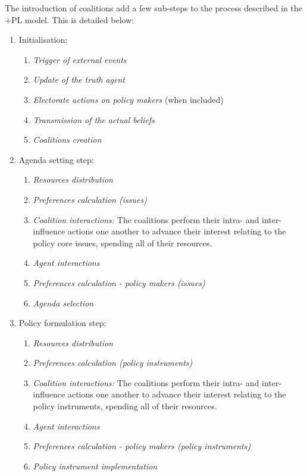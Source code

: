\documentclass[11pt]{article}
\begin{document}
The introduction of coalitions add a few sub-steps to the process described in the +PL model. This is detailed below:

\begin{enumerate}
\item Initialisation:
	
	\begin{enumerate}
	\item \emph{Trigger of external events}
	\item \emph{Update of the truth agent}
	\item \emph{Electorate actions on policy makers} (when included)
	\item \emph{Transmission of the actual beliefs}
	\item \emph{Coalitions creation}
	\end{enumerate}
	
\item Agenda setting step:
	\begin{enumerate}
	\item \emph{Resources distribution}
	\item \emph{Preferences calculation (issues)}
	\item \emph{Coalition interactions:} The coalitions perform their intra- and inter-influence actions one another to advance their interest relating to the policy core issues, spending all of their resources.
	\item \emph{Agent interactions}
	\item \emph{Preferences calculation - policy makers (issues)}
	\item \emph{Agenda selection}
	\end{enumerate}
	
\item Policy formulation step:
	\begin{enumerate}
	\item \emph{Resources distribution}
	\item \emph{Preferences calculation (policy instruments)}
	\item \emph{Coalition interactions:} The coalitions perform their intra- and inter-influence actions one another to advance their interest relating to the policy instruments, spending all of their resources.
	\item \emph{Agent interactions}
	\item \emph{Preferences calculation - policy makers (policy instruments)}
	\item \emph{Policy instrument implementation} 
	\end{enumerate}

\end{enumerate}
\end{document}
